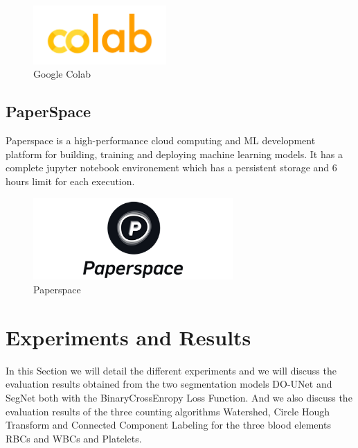 \begin{figure}[H]
\centering
  \vspace{-0.1in}
    \centerline{\includegraphics[width = 2in]{../images/colab.png}}
    \caption{Google Colab}
    \label{Google Colab}
\end{figure}

\subsection{PaperSpace}
Paperspace is a high-performance cloud computing and ML development platform for building, training and deploying machine learning models. It has a complete jupyter notebook environement which has a persistent storage and 6 hours limit for each execution.

\begin{figure}[H]
    \centering
      \vspace{-0.1in}
        \centerline{\includegraphics[width = 3in]{../images/paperspace.png}}
        \caption{Paperspace}
        \label{Paperspace}
    \end{figure}

\section{Experiments and Results}
In this Section we will detail the different experiments and we will discuss the evaluation results obtained from the two segmentation models DO-UNet and SegNet both with the BinaryCrossEnropy Loss Function. And we also discuss the evaluation results of the three counting algorithms Watershed, Circle Hough Transform and Connected Component Labeling for the three blood elements RBCs and WBCs and Platelets.

